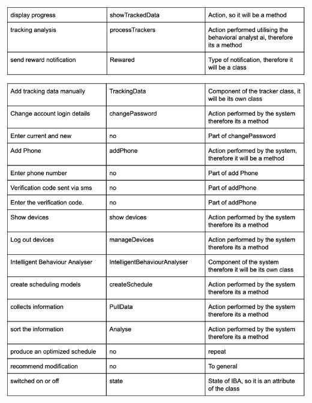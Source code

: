 \documentclass[a4paper,11pt]{article} %
\begin{document}
\begin{center}
    \includegraphics[scale=0.9]{img/noun-verb/table4.png}
\end{center}
\newpage
\end{document}
